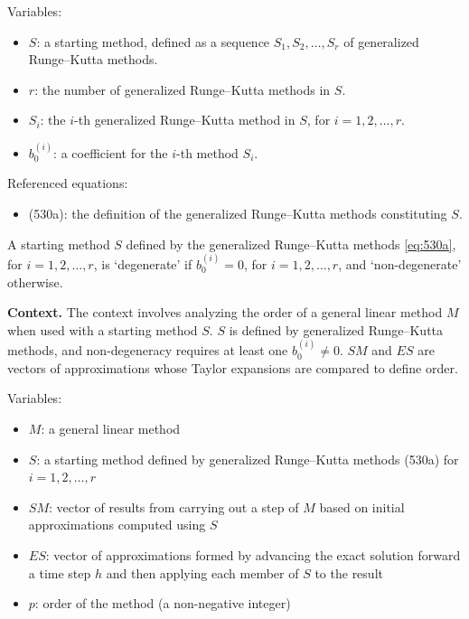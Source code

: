 Variables:
\begin{itemize}
    \item $S$: a starting method, defined as a sequence $S_1, S_2, \dots, S_r$ of generalized Runge--Kutta methods.
    \item $r$: the number of generalized Runge--Kutta methods in $S$.
    \item $S_i$: the $i$-th generalized Runge--Kutta method in $S$, for $i = 1, 2, \dots, r$.
    \item $b_0^{(i)}$: a coefficient for the $i$-th method $S_i$.
\end{itemize}

Referenced equations:
\begin{itemize}
    \item (530a): the definition of the generalized Runge--Kutta methods constituting $S$.
\end{itemize}

\begin{definition}

  \label{def:530A}
  \uses{}
A starting method $S$ defined by the generalized Runge--Kutta methods \eqref{eq:530a}, for $i = 1, 2, \dots, r$, is `degenerate' if $b_0^{(i)} = 0$, for $i = 1, 2, \dots, r$, and `non-degenerate' otherwise.
\end{definition}

\noindent\textbf{Context.}
The context involves analyzing the order of a general linear method $M$ when used with a starting method $S$. $S$ is defined by generalized Runge--Kutta methods, and non-degeneracy requires at least one $b_{0}^{(i)} \neq 0$. $SM$ and $ES$ are vectors of approximations whose Taylor expansions are compared to define order.

Variables:
\begin{itemize}
    \item $M$: a general linear method
    \item $S$: a starting method defined by generalized Runge--Kutta methods (530a) for $i = 1,2,\dots,r$
    \item $SM$: vector of results from carrying out a step of $M$ based on initial approximations computed using $S$
    \item $ES$: vector of approximations formed by advancing the exact solution forward a time step $h$ and then applying each member of $S$ to the result
    \item $p$: order of the method (a non-negative integer)
\end{itemize}

